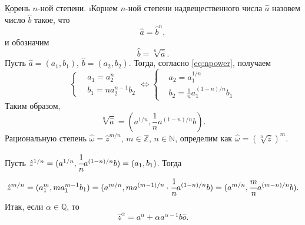 \b{Корень $n$-ной степени.} \i{Корнем $n$-ной степени} надвещественного числа $\hat{a}$ назовем число $\hat{b}$ такое, что 
	$$\hat{a}=\hat{b}^n,$$
и обозначим
	$$\hat{b}=\sqrt[n]{\hat{a}}.$$
Пусть $\hat{a}=(a_1, b_1)$, $\hat{b}=(a_2, b_2)$. Тогда, согласно \eqref{eq:npower}, получаем
	$$\left\{
			\begin{aligned}
				& a_1=a_2^n \\
				& b_1=na_2^{n-1}b_2
			\end{aligned}
		\right.
		\Leftrightarrow
		\left\{
			\begin{aligned}
				& a_2=a_1^{1/n} \\
				& b_2=\frac{1}{n}a_1^{(1-n)/n}b_1
			\end{aligned}
		\right.
	$$
Таким образом,
	\begin{equation}
		\sqrt[n]{\hat{a}}=\left(a^{1/n}, \frac{1}{n}a^{(1-n)/n}b\right).
	\end{equation}
Рациональную степень $\hat{\omega}=\hat{z}^{m/n}$, $m\in\mathbb{Z}$, $n\in\mathbb{N}$, определим как $\hat{\omega}=\left(\sqrt[n]{\hat{z}}\right)^m$.\par
Пусть $\hat{z}^{1/n}=(a^{1/n}, \cfrac{1}{n}a^{(1-n)/n}b)=(a_1, b_1)$. Тогда
	$$\hat{z}^{m/n}=(a_1^m, ma_1^{m-1}b_1)=(a^{m/n}, ma^{(m-1)/n}\cdot\cfrac{1}{n}a^{(1-n)/n}b)=(a^{m/n}, \cfrac{m}{n}a^{(m-n)/n}b).$$
Итак, если $\alpha\in\mathbb{Q}$, то
	\begin{equation}\label{eq:ratpower}
		\hat{z}^{\alpha}=a^{\alpha}+\alpha a^{\alpha-1}b\hat{o}.
	\end{equation}